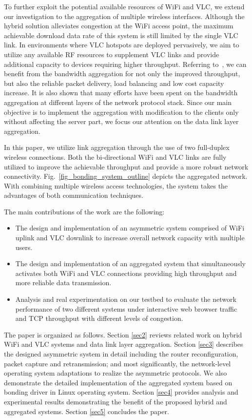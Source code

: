 \documentclass[10pt,journal]{IEEEtran}
\begin{document}
To further exploit the potential available resources of WiFi and VLC, we extend
our investigation to the aggregation of multiple wireless interfaces. Although the
hybrid solution alleviates congestion at the WiFi access point, the maximum
achievable download data rate of this system is still limited by the single
VLC link. In environments where VLC hotspots are deployed pervasively, we aim to utilize any available RF resources to supplement VLC links and provide additional capacity to devices requiring higher throughput. Referring to~\cite{ramaboli2012bandwidth},
we can benefit from the bandwidth aggregation for not only the improved throughput, but also
the reliable packet delivery, load balancing and low cost capacity increase.
It is also shown that many efforts have been spent on the bandwidth aggregation
at different layers of the network protocol stack. Since our main objective is to implement
the aggregation with modification to the clients only without affecting the server part,
we focus our attention on the data link layer aggregation.

In this paper, we utilize link aggregation through the use of two full-duplex
wireless connections. Both the bi-directional WiFi and VLC links are fully utilized to
improve the achievable throughput and provide a more robust network connectivity. Fig.~\ref{fig_bonding_system_outline}
depicts the aggregated network. With combining multiple wireless access technologies,
the system takes the advantages of both communication techniques.

The main contributions of the work are the following:
\begin{itemize}
\item The design and implementation of an asymmetric system comprised of WiFi uplink and VLC downlink to increase overall network capacity with multiple users.
\item The design and implementation of an aggregated system that simultaneously activates both WiFi and VLC connections providing high throughput and more reliable data transmission.
\item Analysis and real experimentation on our testbed to evaluate the network performance of two different systems under interactive web browser traffic and TCP throughput with different levels of congestion.
\end{itemize}

The paper is organized as follows. Section \ref{sec2} reviews related
work on hybrid WiFi and VLC systems and data link layer aggregation. Section \ref{sec3}
describes the designed asymmetric system in detail including the router
reconfiguration, packet capture and retransmission; and most
significantly, the network-level operating system adaptations to
realize the asymmetric protocols. We also demonstrate the detailed implementation of the aggregated system
based on bonding driver in Linux operating system. Section \ref{sec4} provides analysis and
experimental results demonstrating the benefit of the proposed hybrid
and aggregated systems. Section \ref{sec5} concludes the paper.
\end{document}
